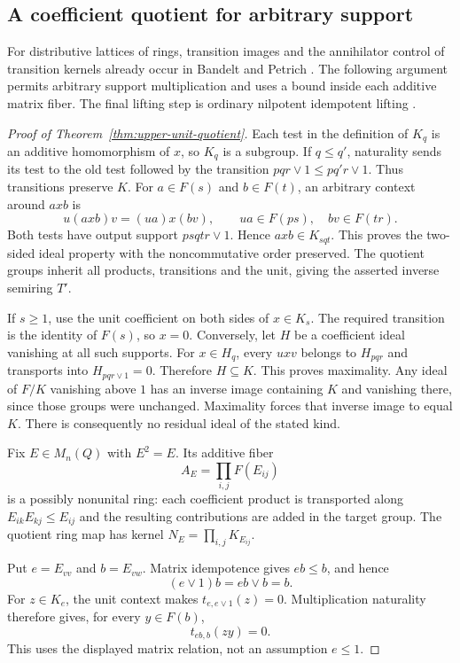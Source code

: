 \subsection{A coefficient quotient for arbitrary support}
\label{subsec:upper-unit-quotient}

For distributive lattices of rings, transition images and the
annihilator control of transition kernels already occur in
Bandelt and Petrich \cite[Lemma~4, pp.~159--160]{BandeltPetrich}.
The following argument permits arbitrary support multiplication and
uses a bound inside each additive matrix fiber. The final lifting step
is ordinary nilpotent idempotent lifting
\cite[Lemma~10.32.7, Tag~05BU]{Stacks}.

\begin{proof}[Proof of Theorem~\ref{thm:upper-unit-quotient}]
Each test in the definition of $K_q$ is an additive homomorphism of
$x$, so $K_q$ is a subgroup. If $q\leq q'$, naturality sends its test
to the old test followed by the transition
$pqr\vee1\leq pq'r\vee1$. Thus transitions preserve $K$.
For $a\in F(s)$ and $b\in F(t)$, an arbitrary context around $axb$
is
\[
 u(axb)v=(ua)x(bv),\qquad
 ua\in F(ps),\quad bv\in F(tr).
\]
Both tests have output support $psqtr\vee1$. Hence $axb\in K_{sqt}$.
This proves the two-sided ideal property with the noncommutative
order preserved. The quotient groups inherit all products,
transitions and the unit, giving the asserted inverse semiring $T'$.

If $s\geq1$, use the unit coefficient on both sides of $x\in K_s$.
The required transition is the identity of $F(s)$, so $x=0$.
Conversely, let $H$ be a coefficient ideal vanishing at all such
supports. For $x\in H_q$, every $uxv$ belongs to $H_{pqr}$ and
transports into $H_{pqr\vee1}=0$. Therefore $H\subseteq K$.
This proves maximality. Any ideal of $F/K$ vanishing above $1$ has
an inverse image containing $K$ and vanishing there, since those
groups were unchanged. Maximality forces that inverse image to equal
$K$. There is consequently no residual ideal of the stated kind.

Fix $E\in M_n(Q)$ with $E^2=E$. Its additive fiber
\[
 A_E=\prod_{i,j}F(E_{ij})
\]
is a possibly nonunital ring: each coefficient product is transported
along $E_{ik}E_{kj}\leq E_{ij}$ and the resulting contributions are
added in the target group. The quotient ring map has kernel
$N_E=\prod_{i,j}K_{E_{ij}}$.

Put $e=E_{vv}$ and $b=E_{vw}$. Matrix idempotence gives $eb\leq b$,
and hence
\[
 (e\vee1)b=eb\vee b=b.
\]
For $z\in K_e$, the unit context makes $t_{e,e\vee1}(z)=0$.
Multiplication naturality therefore gives, for every $y\in F(b)$,
\begin{equation}\label{eq:upper-unit-cycle}
 t_{eb,b}(zy)=0.
\end{equation}
This uses the displayed matrix relation, not an assumption $e\leq1$.


\end{proof}
